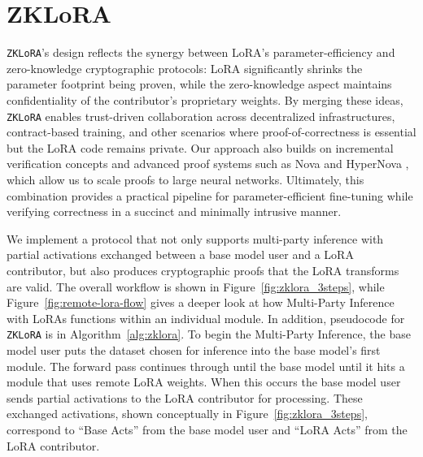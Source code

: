 \documentclass[11pt]{article}
\begin{document}
\section{ZKLoRA}
\texttt{ZKLoRA}'s design reflects the synergy between LoRA’s parameter-efficiency and zero-knowledge cryptographic protocols: LoRA significantly shrinks the parameter footprint being proven, while the zero-knowledge aspect maintains confidentiality of the contributor’s proprietary weights. By merging these ideas, \texttt{ZKLoRA} enables trust-driven collaboration across decentralized infrastructures, contract-based training, and other scenarios where proof-of-correctness is essential but the LoRA code remains private. Our approach also builds on incremental verification concepts \cite{valiant2008incrementally} and advanced proof systems such as Nova \cite{kothapalli2022nova} and HyperNova \cite{kothapalli2024hypernova}, which allow us to scale proofs to large neural networks. Ultimately, this combination provides a practical pipeline for parameter-efficient fine-tuning while verifying correctness in a succinct and minimally intrusive manner.


We implement a protocol that not only supports multi-party inference with partial activations exchanged between a base model user and a LoRA contributor, but also produces cryptographic proofs that the LoRA transforms are valid. The overall workflow is shown in Figure~\ref{fig:zklora_3steps}, while Figure~\ref{fig:remote-lora-flow} gives a deeper look at how Multi-Party Inference with LoRAs functions within an individual module. In addition, pseudocode for \texttt{ZKLoRA} is in Algorithm~\ref{alg:zklora}. To begin the Multi-Party Inference, the base model user puts the dataset chosen for inference into the base model's first module. The forward pass continues through until the base model until it hits a module that uses remote LoRA weights. When this occurs the base model user sends partial activations to the LoRA contributor for processing. These exchanged activations, shown conceptually in Figure~\ref{fig:zklora_3steps}, correspond to “Base Acts” from the base model user and “LoRA Acts” from the LoRA contributor.
\end{document}
